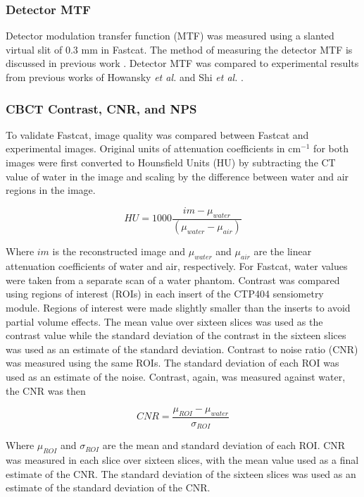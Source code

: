 \subsubsection{Detector MTF}

Detector modulation transfer function (MTF) was measured using a slanted virtual slit of 0.3 mm in Fastcat. The method of measuring the detector MTF is discussed in previous work \cite{OConnell2021FastCAT:Simulation}. Detector MTF was compared to experimental results from previous works of Howansky \textit{et al.} and Shi \textit{et al.} \cite{Howansky2017DirectImaging,Shi2018APerformance}.

\subsubsection{CBCT Contrast, CNR, and NPS}

To validate Fastcat, image quality was compared between Fastcat and experimental images. Original units of attenuation coefficients in cm$^{-1}$ for both images were first converted to Hounsfield Units (HU) by subtracting the CT value of water in the image and scaling by the difference between water and air regions in the image. 

\begin{equation}
HU = 1000 \frac{im - \mu_{water}}{(\mu_{water} - \mu_{air})}
\end{equation}
                   
Where $im$ is the reconstructed image and $\mu_{water}$ and $\mu_{air}$ are the linear attenuation coefficients of water and air, respectively. For Fastcat, water values were taken from a separate scan of a water phantom. Contrast was compared using regions of interest (ROIs) in each insert of the CTP404 sensiometry module. Regions of interest were made slightly smaller than the inserts to avoid partial volume effects. The mean value over sixteen slices was used as the contrast value while the standard deviation of the contrast in the sixteen slices was used as an estimate of the standard deviation. Contrast to noise ratio (CNR) was measured using the same ROIs. The standard deviation of each ROI was used as an estimate of the noise. Contrast, again, was measured against water, the CNR was then

\begin{equation}
CNR = \frac{\mu_{ROI} - \mu_{water}}{\sigma_{ROI}}
\end{equation}

Where $\mu_{ROI}$ and $\sigma_{ROI}$ are the mean and standard deviation of each ROI. CNR was measured in each slice over sixteen slices, with the mean value used as a final estimate of the CNR. The standard deviation of the sixteen slices was used as an estimate of the standard deviation of the CNR.

